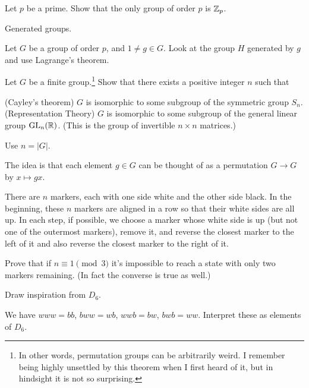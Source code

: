 \begin{sproblem}
	Let $p$ be a prime.
	Show that the only group of order $p$ is $\mathbb Z_{p}$.
	\begin{hint}
		Generated groups.
	\end{hint}
	\begin{sol}
		Let $G$ be a group of order $p$, and $1 \neq g \in G$.
		Look at the group $H$ generated by $g$ and use Lagrange's theorem.
	\end{sol}
\end{sproblem}

\begin{dproblem}
	\gim
	Let $G$ be a finite group.\footnote{
		In other words, permutation groups can be arbitrarily weird.
		I remember being highly unsettled by this theorem when I first heard of it,
		but in hindsight it is not so surprising.}
	Show that there exists a positive integer $n$ such that
	\begin{enumerate}[(a)]
		\ii (Cayley's theorem) $G$ is isomorphic to some subgroup of the symmetric group $S_n$.
		\ii (Representation Theory) $G$ is isomorphic to some subgroup of
		the general linear group $\operatorname{GL}_n(\mathbb R)$.
		(This is the group of invertible $n \times n$ matrices.)
	\end{enumerate}
	\label{thm:cayley_theorem}
	\begin{hint}
		Use $n = \left\lvert G \right\rvert$.
	\end{hint}
	\begin{sol}
		The idea is that each element $g \in G$ can be thought of as a permutation
		$G \to G$ by $x \mapsto gx$.
	\end{sol}
\end{dproblem}

\begin{problem}
	[IMO SL 2005 C5] \gim
	There are $n$ markers, each with one side white and the other side black.
	In the beginning, these $n$ markers are aligned in a row so that their white sides are all up.
	In each step, if possible, we choose a marker whose white side is up
	(but not one of the outermost markers),
	remove it, and reverse the closest marker to the left of it
	and also reverse the closest marker to the right of it.
	
	Prove that if $n \equiv 1 \pmod 3$ it's impossible to reach a state
	with only two markers remaining.
	(In fact the converse is true as well.)
	\begin{hint}
		Draw inspiration from $D_6$.
	\end{hint}
	\begin{sol}
		We have $www = bb$, $bww = wb$, $wwb = bw$, $bwb = ww$.
		Interpret these as elements of $D_6$.
	\end{sol}
\end{problem}


